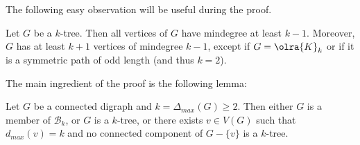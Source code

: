 The following easy observation will be useful during the proof. 
\begin{observation}\label{obs_1}
Let $G$ be a $k$-tree. 
Then all vertices of $G$ have mindegree at least $k-1$. Moreover, $G$ has at least $k+1$ vertices of mindegree $k-1$, except if $G = \olra{K}_{k}$ or if it is a symmetric path of odd length (and thus $k=2$). 
\end{observation}

The main ingredient of the proof is the following lemma:

\begin{lemma}\label{lem:ktree}
Let $G$ be a connected digraph and $k = \Delta_{max}(G) \geq 2$. 
Then either $G$ is a member of $\mathcal B_k$, or $G$ is a $k$-tree, or there exists $v \in V(G)$ such that $d_{max}(v) = k$ and no connected component of $G - \{v\}$ is a $k$-tree. 
\end{lemma}

